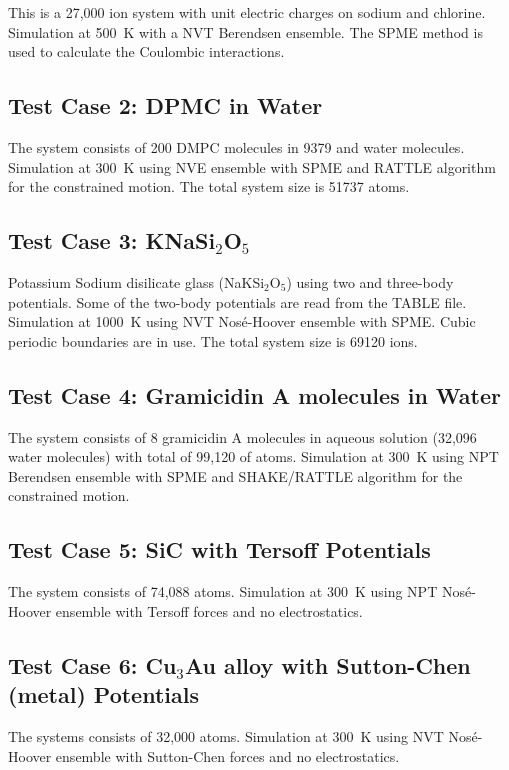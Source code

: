 This is a 27,000 ion system with unit electric charges on sodium and
chlorine.  Simulation at 500~K with a NVT Berendsen ensemble.  The SPME
method is used to calculate the Coulombic interactions.

\subsection{Test Case 2: DPMC in Water}

The system consists of 200 DMPC molecules in 9379 and water molecules.
Simulation at 300~K using NVE ensemble with SPME and RATTLE algorithm
for the constrained motion.  The total system size is 51737 atoms.

\subsection{Test Case 3: KNaSi$_{2}$O$_{5}$}

Potassium Sodium disilicate glass (NaKSi$_{2}$O$_{5}$) using two and
three-body potentials.  Some of the two-body potentials are read
from the TABLE file.  Simulation at 1000~K using NVT Nos\'e-Hoover
ensemble with SPME.  Cubic periodic boundaries are in use.  The
total system size is 69120 ions.

\subsection{Test Case 4: Gramicidin A molecules in Water}

The system consists of 8 gramicidin A molecules in aqueous solution
(32,096 water molecules) with total of 99,120 of atoms.  Simulation
at 300~K using NPT Berendsen ensemble with SPME and SHAKE/RATTLE
algorithm for the constrained motion.

\subsection{Test Case 5: SiC with Tersoff Potentials}

The system consists of 74,088 atoms.  Simulation at 300~K using NPT
Nos\'e-Hoover ensemble with Tersoff forces and no electrostatics.

\subsection{Test Case 6: Cu$_{3}$Au alloy with Sutton-Chen (metal) Potentials}

The systems consists of 32,000 atoms.  Simulation at 300~K using NVT
Nos\'e-Hoover ensemble with Sutton-Chen forces and no electrostatics.

